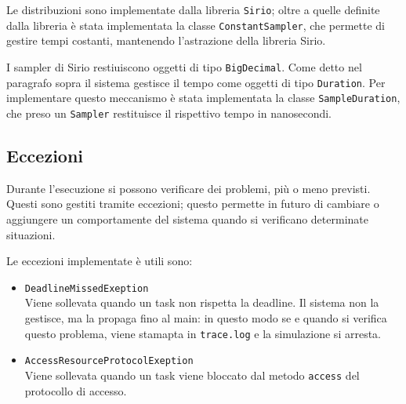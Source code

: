 Le distribuzioni sono implementate dalla libreria \texttt{Sirio}; oltre a quelle definite dalla libreria è stata implementata la classe \texttt{ConstantSampler}, che permette di gestire tempi costanti, mantenendo l'astrazione della libreria Sirio.

\myskip

I sampler di Sirio restiuiscono oggetti di tipo \texttt{BigDecimal}. Come detto nel paragrafo sopra il sistema gestisce il tempo come oggetti di tipo \texttt{Duration}. Per implementare questo meccanismo è stata implementata la classe \texttt{SampleDuration}, che preso un \texttt{Sampler} restituisce il rispettivo tempo in nanosecondi.

\subsection{Eccezioni}
Durante l'esecuzione si possono verificare dei problemi, più o meno previsti. Questi sono gestiti tramite eccezioni; questo permette in futuro di cambiare o aggiungere un comportamente del sistema quando si verificano determinate situazioni.

\myskip

Le eccezioni implementate è utili sono:
\begin{itemize}
    \item \texttt{DeadlineMissedExeption} \\
        Viene sollevata quando un task non rispetta la deadline. Il sistema non la gestisce, ma la propaga fino al main: in questo modo se e quando si verifica questo problema, viene stamapta in \texttt{trace.log} e la simulazione si arresta.
    \item \texttt{AccessResourceProtocolExeption} \\
        Viene sollevata quando un task viene bloccato dal metodo \texttt{access} del protocollo di accesso.
\end{itemize}